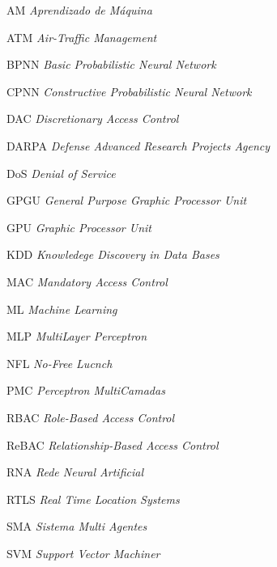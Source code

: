 \documentclass[
	12pt,				%
	openright,			%
	twoside,			%
	a4paper,			%
	english,			%
	french,				%
	spanish,			%
	brazil				%
	]{abntex2}
\begin{document}
\begin{siglas}
  \item[AM] \textit{Aprendizado de Máquina}
  \item[ATM] \textit{Air-Traffic Management}
  \item[BPNN] \textit{Basic Probabilistic Neural Network}
  \item[CPNN] \textit{Constructive Probabilistic Neural Network}
  \item[DAC] \textit{Discretionary Access Control}
  \item[DARPA] \textit{Defense Advanced Research Projects Agency}
  \item[DoS] \textit{Denial of Service}
  \item[GPGU] \textit{General Purpose Graphic Processor Unit}
  \item[GPU] \textit{Graphic Processor Unit}
  \item[KDD] \textit{Knowledege Discovery in Data Bases}
  \item[MAC] \textit{Mandatory Access Control}
  \item[ML] \textit{Machine Learning}
  \item[MLP] \textit{MultiLayer Perceptron}
  \item[NFL] \textit{No-Free Lucnch}
  \item[PMC] \textit{Perceptron MultiCamadas}
  \item[RBAC] \textit{Role-Based Access Control}
  \item[ReBAC] \textit{Relationship-Based Access Control}
  \item[RNA] \textit{Rede Neural Artificial}
  \item[RTLS] \textit{Real Time Location Systems}
  \item[SMA] \textit{Sistema Multi Agentes}
  \item[SVM] \textit{Support Vector Machiner}
\end{siglas}


\tableofcontents*
\cleardoublepage
\end{document}
